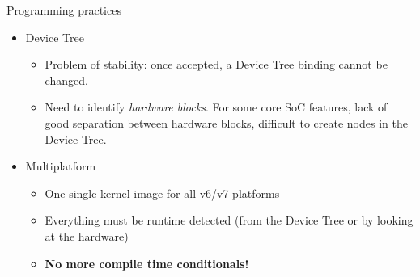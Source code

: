 \begin{frame}{Programming practices}
  \begin{itemize}
  \item Device Tree
    \begin{itemize}
    \item Problem of stability: once accepted, a Device Tree binding
      cannot be changed.
    \item Need to identify {\em hardware blocks}. For some core SoC
      features, lack of good separation between hardware blocks, difficult
      to create nodes in the Device Tree.
    \end{itemize}
  \item Multiplatform
    \begin{itemize}
    \item One single kernel image for all v6/v7 platforms
    \item Everything must be runtime detected (from the Device Tree or by
      looking at the hardware)
    \item {\bf No more compile time conditionals!}
    \end{itemize}
  \end{itemize}
\end{frame}